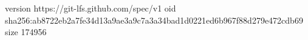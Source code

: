 version https://git-lfs.github.com/spec/v1
oid sha256:ab8722eb2a7fe34d13a9ae3a9c7a3a34bad1d0221ed6b967f88d279e472cdb69
size 174956
